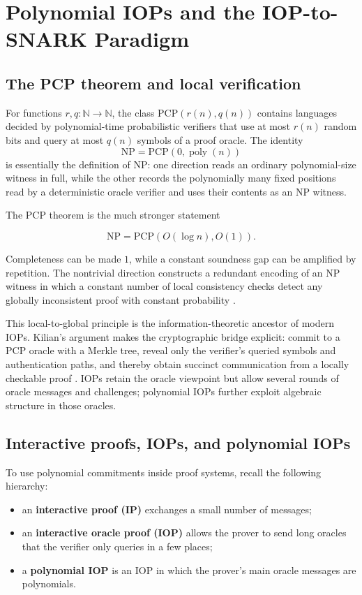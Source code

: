 \section{Polynomial IOPs and the IOP-to-SNARK Paradigm}
\label{sec:iop-paradigm}

\subsection{The PCP theorem and local verification}

For functions $r,q:\mathbb{N}\to\mathbb{N}$, the class $\mathrm{PCP}(r(n),q(n))$ contains languages decided by polynomial-time probabilistic verifiers that use at most $r(n)$ random bits and query at most $q(n)$ symbols of a proof oracle. The identity
\[
\mathrm{NP}=\mathrm{PCP}(0,\operatorname{poly}(n))
\]
is essentially the definition of NP: one direction reads an ordinary polynomial-size witness in full, while the other records the polynomially many fixed positions read by a deterministic oracle verifier and uses their contents as an NP witness.

The PCP theorem is the much stronger statement
\begin{tcolorbox}
\[
\mathrm{NP}=\mathrm{PCP}(O(\log n),O(1)).
\]
\end{tcolorbox}
Completeness can be made $1$, while a constant soundness gap can be amplified by repetition. The nontrivial direction constructs a redundant encoding of an NP witness in which a constant number of local consistency checks detect any globally inconsistent proof with constant probability \cite{AroraSafra1998,AroraLundMotwaniSudanSzegedy1998}.

This local-to-global principle is the information-theoretic ancestor of modern IOPs. Kilian's argument makes the cryptographic bridge explicit: commit to a PCP oracle with a Merkle tree, reveal only the verifier's queried symbols and authentication paths, and thereby obtain succinct communication from a locally checkable proof \cite{Kilian1992}. IOPs retain the oracle viewpoint but allow several rounds of oracle messages and challenges; polynomial IOPs further exploit algebraic structure in those oracles.

\subsection{Interactive proofs, IOPs, and polynomial IOPs}

To use polynomial commitments inside proof systems, recall the following hierarchy:
\begin{itemize}[leftmargin=2em]
    \item an \textbf{interactive proof (IP)} exchanges a small number of messages;
    \item an \textbf{interactive oracle proof (IOP)} allows the prover to send long oracles that the verifier only queries in a few places;
    \item a \textbf{polynomial IOP} is an IOP in which the prover's main oracle messages are polynomials.
\end{itemize}


